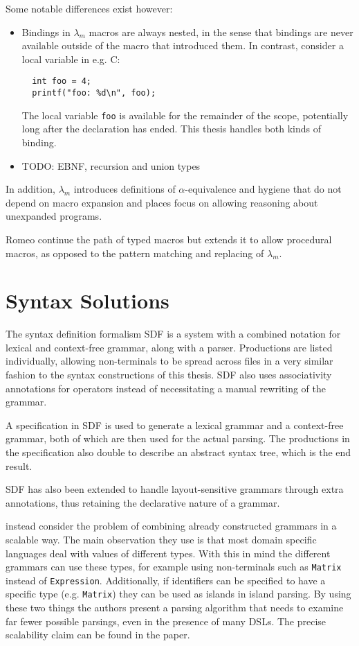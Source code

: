 \documentclass{kththesis}
\begin{document}
Some notable differences exist however:
\begin{itemize}
  \item Bindings in $\lambda_m$ macros are always nested, in the sense that bindings are never available outside of the macro that introduced them. In contrast, consider a local variable in e.g. C:
  \begin{verbatim}
  int foo = 4;
  printf("foo: %d\n", foo);
  \end{verbatim}
  The local variable \texttt{foo} is available for the remainder of the scope, potentially long after the declaration has ended. This thesis handles both kinds of binding.
  \item TODO: EBNF, recursion and union types
\end{itemize}

In addition, $\lambda_m$ introduces definitions of $\alpha$-equivalence and hygiene that do not depend on macro expansion and places focus on allowing reasoning about unexpanded programs.

Romeo \cite{Stansifer2014} continue the path of typed macros but extends it to allow procedural macros, as opposed to the pattern matching and replacing of $\lambda_m$.

\section{Syntax Solutions} \label{sec:syntax-solutions}

The syntax definition formalism SDF \cite{Heering1989} is a system with a combined notation for lexical and context-free grammar, along with a parser. Productions are listed individually, allowing non-terminals to be spread across files in a very similar fashion to the syntax constructions of this thesis. SDF also uses associativity annotations for operators instead of necessitating a manual rewriting of the grammar.

A specification in SDF is used to generate a lexical grammar and a context-free grammar, both of which are then used for the actual parsing. The productions in the specification also double to describe an abstract syntax tree, which is the end result.

SDF has also been extended to handle layout-sensitive grammars \cite{Erdweg2013} through extra annotations, thus retaining the declarative nature of a grammar.

\textcite{Silkensen2013} instead consider the problem of combining already constructed grammars in a scalable way. The main observation they use is that most domain specific languages deal with values of different types. With this in mind the different grammars can use these types, for example using non-terminals such as \texttt{Matrix} instead of \texttt{Expression}. Additionally, if identifiers can be specified to have a specific type (e.g. \texttt{Matrix}) they can be used as islands in island parsing. By using these two things the authors present a parsing algorithm that needs to examine far fewer possible parsings, even in the presence of many DSLs. The precise scalability claim can be found in the paper.
\end{document}
